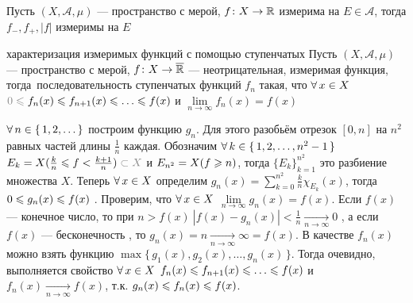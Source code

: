 \begin{slv}[https://www.youtube.com/live/D_Nn53jVQxE?si=-ruvK9hIfLccwsL8&t=10730]\label{изм.ср.}
	Пусть $(X, \mathcal A, \mu)$ --- пространство с мерой, $f \colon X \to \mathbb R$ измерима на $E \in \mathcal{A}$, тогда $f_-, f_+, |f|$ измеримы на $E$ 
\end{slv}

\begin{teor}[https://www.youtube.com/live/D_Nn53jVQxE?si=JtFCmDrkbkpkwKzS&t=10835]{характеризация измеримых функций с помощью ступенчатых}\label{изм.ф.ступ.}%
	Пусть $(X, \mathcal A, \mu)$ --- пространство с мерой, $f \colon X \to \overline {\mathbb R}$ --- неотрицательная, измеримая функция, тогда\E\ последовательность ступенчатых функций $f_n$ такая, что $\forall \, x \in X$ $\uns{0 \<{}} f_n(x) \< f_{n + 1}(x) \< \ldots \< f(x)$ и $\lim\limits_{n \to \infty} f_n(x) = f(x)$
\end{teor}

\begin{prf}
	$\forall \, n \in \{\,1, 2, \ldots \,\}$ построим функцию $g_n$. Для этого разобьём отрезок $[0, n]$ на $n^2$ равных частей длины $\frac 1n$ каждая. Обозначим $\forall \, k \in \{\,1, 2, \ldots, n^2 - 1\,\}$ $E_k = X(\frac kn \< f < \frac{k + 1}{n}) \uns{{}\subset X}$ и $E_{n^2} = X(f \geqslant n)$, тогда $\{E_k\}_{k = 1}^{n^2}$ это разбиение множества $X$. Теперь $\forall \, x \in X$ определим $g_n(x) = \sum\limits_{k = 0}^{n^2} \frac kn \chi_{E_k}(x)$, тогда $0 \leqslant g_n(x) \leqslant f(x)$ . Проверим, что $\forall \, x \in X$ $\lim\limits_{n \to \infty}g_n(x) = f(x)$. Если $f(x)$ --- конечное число, то при $n > f(x)\ |f(x) - g_n(x)| < \frac 1n \xrightarrow[n \to \infty]{} 0$ , а если $f(x)$ --- бесконечность , то $g_n(x) = n \xrightarrow[n \to \infty]{} \infty = f(x)$. В качестве $f_n(x)$  можно взять функцию $\max\{\, g_1(x), g_2(x), \ldots, g_n(x)\,\}$. Тогда  очевидно, выполняется свойство $\forall \, x \in X$ $f_n(x) \leqslant f_{n + 1}(x) \leqslant \ldots \leqslant f(x)$ и $f_n(x) \xrightarrow[n \to \infty]{} f(x)$, т.к. $g_n(x) \leqslant f_n(x) \leqslant f(x)$.
\end{prf}

